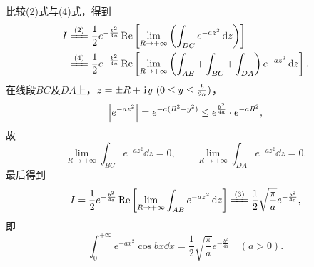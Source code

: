 \begin{example}
\begin{solution}
比较(2)式与(4)式，得到\[
\begin{split}
I &\xlongequal{\rm(2)} \frac{1}{2} e^{-\frac{b^2}{4a}} \Re\left[\lim\limits_{R\to+\infty} \left( \int_{DC} e^{-az^2} \dd{z} \right)\right] \\
&\xlongequal{\rm(4)} \frac{1}{2} e^{-\frac{b^2}{4a}} \Re\left[\lim\limits_{R\to+\infty} \left( \int_{AB} + \int_{BC} + \int_{DA}\right) e^{-az^2} \dd{z}\right].
\end{split}
\]
在线段\(BC\)及\(DA\)上，\(z=\pm R+\kern1pt\mathrm{i}\kern1pt y\ (0 \leq y \leq \frac{b}{2a})\)，\[
\abs{e^{-az^2}}
= e^{-a(R^2-y^2)}
\leq e^{\frac{b^2}{4a}} \cdot e^{-aR^2},
\]故\[
\lim\limits_{R\to+\infty} \int_{BC} e^{-az^2} \dd{z} = 0,
\qquad
\lim\limits_{R\to+\infty} \int_{DA} e^{-az^2} \dd{z} = 0.
\]最后得到\[
I = \frac{1}{2} e^{-\frac{b^2}{4a}} \Re\left[ \lim\limits_{R\to+\infty} \int_{AB} e^{-az^2} \dd{z} \right]
\xlongequal{\rm(3)} \frac{1}{2} \sqrt{\frac{\pi}{a}} e^{-\frac{b^2}{4a}},
\]即\begin{equation}\label{equation:留数定理.泊松积分}
\int_0^{+\infty} e^{-ax^2} \cos bx \dd{x}
= \frac{1}{2} \sqrt{\frac{\pi}{a}} e^{-\frac{b^2}{4a}}
\quad(a>0).
\end{equation}
\end{solution}
\end{example}

